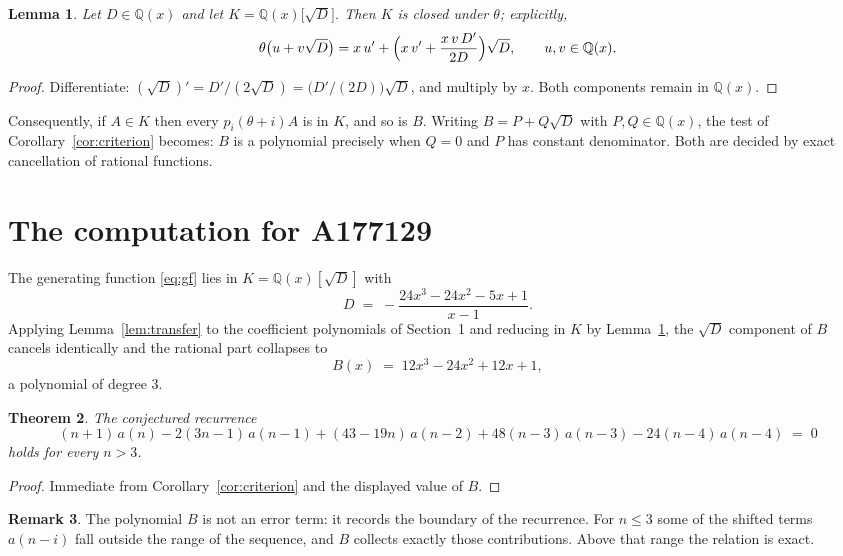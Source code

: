 \documentclass[11pt,a4paper]{article}
\theoremstyle{plain}
\newtheorem{theorem}{Theorem}
\newtheorem{lemma}[theorem]{Lemma}
\theoremstyle{definition}
\newtheorem{remark}[theorem]{Remark}
\begin{document}
\begin{lemma}\label{lem:field}
Let $D\in\mathbb{Q}(x)$ and let $K=\mathbb{Q}(x)\bigl[\sqrt{D}\bigr]$. Then $K$ is closed
under $\theta$; explicitly,
\[
\theta\bigl(u+v\sqrt{D}\bigr)=x\,u'+\Bigl(x\,v'+\frac{x\,v\,D'}{2D}\Bigr)\sqrt{D},
\qquad u,v\in\mathbb{Q}(x).
\]
\end{lemma}

\begin{proof}
Differentiate: $(\sqrt{D})'=D'/(2\sqrt{D})=\bigl(D'/(2D)\bigr)\sqrt{D}$, and multiply by
$x$. Both components remain in $\mathbb{Q}(x)$.
\end{proof}

Consequently, if $A\in K$ then every $p_{i}(\theta+i)A$ is in $K$, and so is $B$. Writing
$B=P+Q\sqrt{D}$ with $P,Q\in\mathbb{Q}(x)$, the test of Corollary~\ref{cor:criterion}
becomes: $B$ is a polynomial precisely when $Q=0$ and $P$ has constant denominator. Both
are decided by exact cancellation of rational functions.

\section{The computation for A177129}

The generating function \eqref{eq:gf} lies in $K=\mathbb{Q}(x)[\sqrt{D}]$ with
\[
D \;=\; - \frac{24 x^{3} - 24 x^{2} - 5 x + 1}{x - 1} .
\]
Applying Lemma~\ref{lem:transfer} to the coefficient polynomials of Section~1 and reducing
in $K$ by Lemma~\ref{lem:field}, the $\sqrt{D}$ component of $B$ cancels identically and
the rational part collapses to
\[
B(x)\;=\;12 x^{3} - 24 x^{2} + 12 x + 1 ,
\]
a polynomial of degree $3$.

\begin{theorem}
The conjectured recurrence
\[
(n + 1)\,a(n) -  2 \left(3 n - 1\right)\,a(n-1) + (43 - 19 n)\,a(n-2) + 48 \left(n - 3\right)\,a(n-3) -  24 \left(n - 4\right)\,a(n-4) \;=\;0
\]
holds for every $n>3$.
\end{theorem}

\begin{proof}
Immediate from Corollary~\ref{cor:criterion} and the displayed value of $B$.
\end{proof}

\begin{remark}
The polynomial $B$ is not an error term: it records the boundary of the recurrence. For
$n\le3$ some of the shifted terms $a(n-i)$ fall outside the range of the sequence,
and $B$ collects exactly those contributions. Above that range the relation is exact.
\end{remark}
\end{document}
